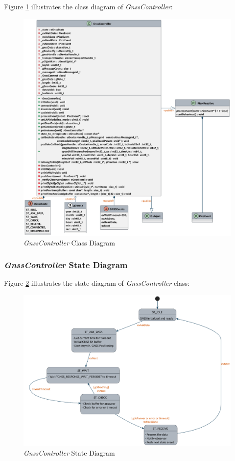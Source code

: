 \documentclass[report.tex]{subfiles}
\begin{document}
Figure \ref{fig:gnsscontroller} illustrates the class diagram of \textit{GnssController}: 

\begin{figure}[H]
	\centering
	\includegraphics[width=1\textwidth]{Include/Figure/software/class/gnsscontroller.pdf}
	\caption{\textit{GnssController} Class Diagram}
	\label{fig:gnsscontroller}
\end{figure}

\pagebreak
\subsubsection{\textit{GnssController} State Diagram}

Figure \ref{fig:gnssController} illustrates the state diagram of \textit{GnssController} class: 

\begin{figure}[H]
	\centering
	\includegraphics[width=1\textwidth]{Include/Figure/software/state/gnssController.pdf}
	\caption{\textit{GnssController} State Diagram}
	\label{fig:gnssController}
\end{figure}
\end{document}
